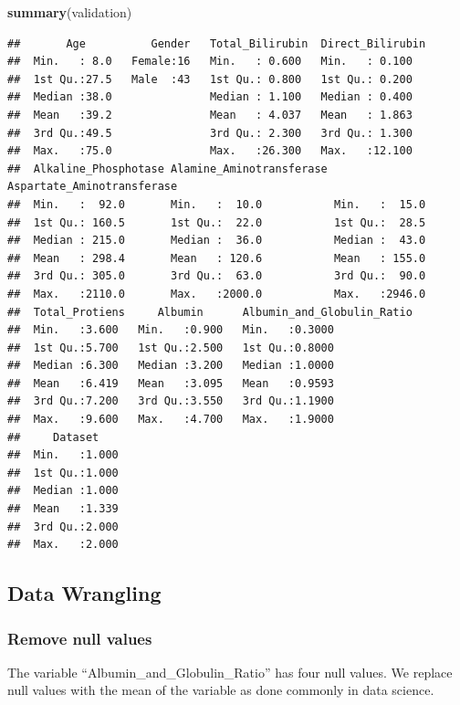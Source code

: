 \documentclass[]{article}
\newenvironment{Shaded}{\begin{snugshade}}{\end{snugshade}}
\newcommand{\KeywordTok}[1]{\textcolor[rgb]{0.13,0.29,0.53}{\textbf{#1}}}
\newcommand{\NormalTok}[1]{#1}
\begin{document}
\begin{Shaded}
\begin{Highlighting}[]
\KeywordTok{summary}\NormalTok{(validation)}
\end{Highlighting}
\end{Shaded}

\begin{verbatim}
##       Age          Gender   Total_Bilirubin  Direct_Bilirubin
##  Min.   : 8.0   Female:16   Min.   : 0.600   Min.   : 0.100  
##  1st Qu.:27.5   Male  :43   1st Qu.: 0.800   1st Qu.: 0.200  
##  Median :38.0               Median : 1.100   Median : 0.400  
##  Mean   :39.2               Mean   : 4.037   Mean   : 1.863  
##  3rd Qu.:49.5               3rd Qu.: 2.300   3rd Qu.: 1.300  
##  Max.   :75.0               Max.   :26.300   Max.   :12.100  
##  Alkaline_Phosphotase Alamine_Aminotransferase Aspartate_Aminotransferase
##  Min.   :  92.0       Min.   :  10.0           Min.   :  15.0            
##  1st Qu.: 160.5       1st Qu.:  22.0           1st Qu.:  28.5            
##  Median : 215.0       Median :  36.0           Median :  43.0            
##  Mean   : 298.4       Mean   : 120.6           Mean   : 155.0            
##  3rd Qu.: 305.0       3rd Qu.:  63.0           3rd Qu.:  90.0            
##  Max.   :2110.0       Max.   :2000.0           Max.   :2946.0            
##  Total_Protiens     Albumin      Albumin_and_Globulin_Ratio
##  Min.   :3.600   Min.   :0.900   Min.   :0.3000            
##  1st Qu.:5.700   1st Qu.:2.500   1st Qu.:0.8000            
##  Median :6.300   Median :3.200   Median :1.0000            
##  Mean   :6.419   Mean   :3.095   Mean   :0.9593            
##  3rd Qu.:7.200   3rd Qu.:3.550   3rd Qu.:1.1900            
##  Max.   :9.600   Max.   :4.700   Max.   :1.9000            
##     Dataset     
##  Min.   :1.000  
##  1st Qu.:1.000  
##  Median :1.000  
##  Mean   :1.339  
##  3rd Qu.:2.000  
##  Max.   :2.000
\end{verbatim}

\subsection{Data Wrangling}
\label{sec:dw}
\subsubsection{Remove null values}

The variable ``Albumin\_and\_Globulin\_Ratio'' has four null values. We
replace null values with the mean of the variable as done commonly in
data science.
\end{document}
